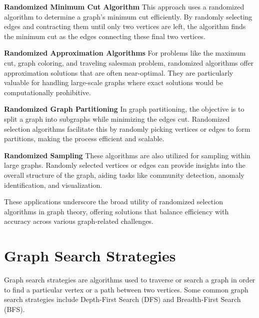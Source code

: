 \documentclass[12pt]{book} %
\begin{document}
\textbf{Randomized Minimum Cut Algorithm}
This approach uses a randomized algorithm to determine a graph's minimum cut efficiently. By randomly selecting edges and contracting them until only two vertices are left, the algorithm finds the minimum cut as the edges connecting these final two vertices.

\textbf{Randomized Approximation Algorithms}
For problems like the maximum cut, graph coloring, and traveling salesman problem, randomized algorithms offer approximation solutions that are often near-optimal. They are particularly valuable for handling large-scale graphs where exact solutions would be computationally prohibitive.

\textbf{Randomized Graph Partitioning}
In graph partitioning, the objective is to split a graph into subgraphs while minimizing the edges cut. Randomized selection algorithms facilitate this by randomly picking vertices or edges to form partitions, making the process efficient and scalable.

\textbf{Randomized Sampling}
These algorithms are also utilized for sampling within large graphs. Randomly selected vertices or edges can provide insights into the overall structure of the graph, aiding tasks like community detection, anomaly identification, and visualization.

These applications underscore the broad utility of randomized selection algorithms in graph theory, offering solutions that balance efficiency with accuracy across various graph-related challenges.


\section{Graph Search Strategies}
Graph search strategies are algorithms used to traverse or search a graph in order to find a particular vertex or a path between two vertices. Some common graph search strategies include Depth-First Search (DFS) and Breadth-First Search (BFS).
\end{document}
